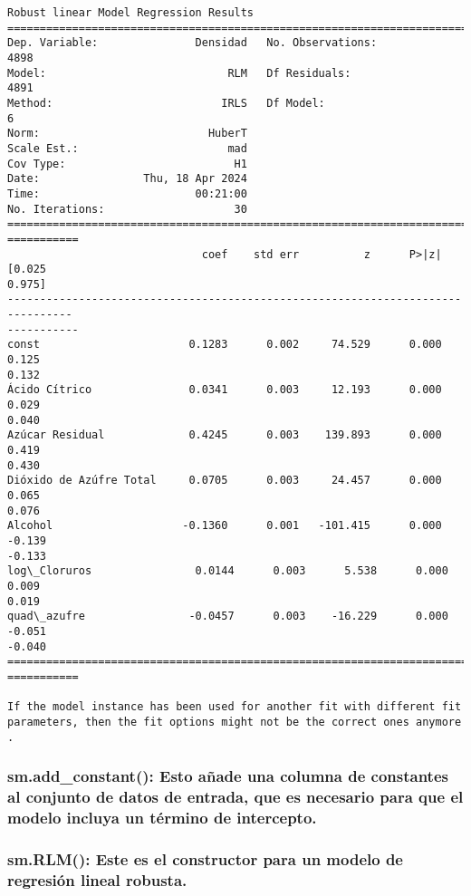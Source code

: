 \documentclass[11pt]{article}
\begin{document}
    \begin{Verbatim}[commandchars=\\\{\}]
                    Robust linear Model Regression Results
==============================================================================
Dep. Variable:               Densidad   No. Observations:                 4898
Model:                            RLM   Df Residuals:                     4891
Method:                          IRLS   Df Model:                            6
Norm:                          HuberT
Scale Est.:                       mad
Cov Type:                          H1
Date:                Thu, 18 Apr 2024
Time:                        00:21:00
No. Iterations:                    30
================================================================================
===========
                              coef    std err          z      P>|z|      [0.025
0.975]
--------------------------------------------------------------------------------
-----------
const                       0.1283      0.002     74.529      0.000       0.125
0.132
Ácido Cítrico               0.0341      0.003     12.193      0.000       0.029
0.040
Azúcar Residual             0.4245      0.003    139.893      0.000       0.419
0.430
Dióxido de Azúfre Total     0.0705      0.003     24.457      0.000       0.065
0.076
Alcohol                    -0.1360      0.001   -101.415      0.000      -0.139
-0.133
log\_Cloruros                0.0144      0.003      5.538      0.000       0.009
0.019
quad\_azufre                -0.0457      0.003    -16.229      0.000      -0.051
-0.040
================================================================================
===========

If the model instance has been used for another fit with different fit
parameters, then the fit options might not be the correct ones anymore .
    \end{Verbatim}

    \subsubsection{sm.add\_constant(): Esto añade una columna de constantes
al conjunto de datos de entrada, que es necesario para que el modelo
incluya un término de
intercepto.}\label{sm.add_constant-esto-auxf1ade-una-columna-de-constantes-al-conjunto-de-datos-de-entrada-que-es-necesario-para-que-el-modelo-incluya-un-tuxe9rmino-de-intercepto.}

\subsubsection{sm.RLM(): Este es el constructor para un modelo de
regresión lineal
robusta.}\label{sm.rlm-este-es-el-constructor-para-un-modelo-de-regresiuxf3n-lineal-robusta.}
\end{document}
